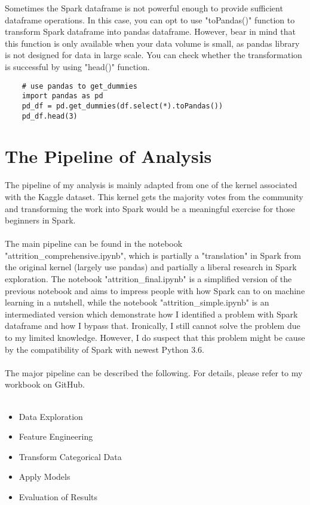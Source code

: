 \documentclass[a4paper, 12pt]{article}
\begin{document}
    Sometimes the Spark dataframe is not powerful enough to provide sufficient dataframe operations. 
    In this case, you can opt to use "toPandas()" function to transform Spark dataframe into pandas dataframe.
    However, bear in mind that this function is only available when your data volume is small, as 
    pandas library is not designed for data in large scale. You can check whether the transformation is 
    successful by using "head()" function.
    \begin{verbatim}
    # use pandas to get_dummies
    import pandas as pd
    pd_df = pd.get_dummies(df.select(*).toPandas())
    pd_df.head(3)
    \end{verbatim}
    
    \section*{The Pipeline of Analysis}
    The pipeline of my analysis is mainly adapted from one of the kernel\cite{kernel} associated with the Kaggle 
    dataset\cite{datakaggle}. This kernel gets the majority votes from the community and transforming the 
    work into Spark would be a meaningful exercise for those beginners in Spark. \\
    \\
    The main pipeline can be found in the notebook "attrition\_comprehensive.ipynb", which is partially a 
    "translation" in Spark from the original kernel (largely use pandas) and partially a liberal research 
    in Spark exploration. The notebook "attrition\_final.ipynb" is a simplified version of the previous notebook 
    and aims to impress people with how Spark can to on machine learning in a nutshell, while the notebook 
    "attrition\_simple.ipynb" is an intermediated version which demonstrate how I identified a problem with 
    Spark dataframe and how I bypass that. Ironically, I still cannot solve the problem due to my limited knowledge. 
    However, I do suspect that this problem might be cause by the compatibility of Spark with newest Python 3.6.\\
    \\
    The major pipeline can be described the following. For details, please refer to my workbook on GitHub.\\
    \\
    \begin{itemize}
        \item Data Exploration
        \item Feature Engineering
        \item Transform Categorical Data
        \item Apply Models
        \item Evaluation of Results
    \end{itemize}
    
\end{document}
